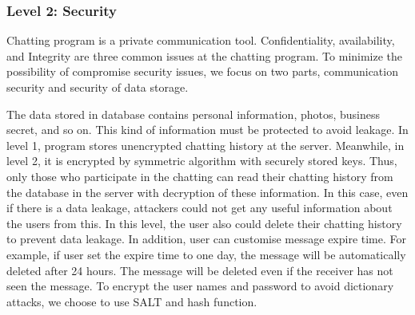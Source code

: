 \documentclass[a4paper,11pt]{article}
\begin{document}
\begin{itemize}
\begin{enumerate}
\end{enumerate}
\end{itemize}






\subsubsection{Level 2: Security}

Chatting program is a private communication tool. Confidentiality, availability, and Integrity are three common issues at the chatting program. To minimize the possibility of compromise security issues, we focus on two parts, communication security and security of data storage.     

The data stored in database contains personal information, photos, business secret, and so on. This kind of information must be protected to avoid leakage. In level 1, program stores unencrypted chatting history at the server. Meanwhile, in level 2, it is encrypted by symmetric algorithm with securely stored keys. Thus, only those who participate in the chatting can read their chatting history from the database in the server with decryption of these information. In this case, even if there is a data leakage, attackers could not get any useful information about the users from this. In this level, the user also could delete their chatting history to prevent data leakage. In addition, user can customise message expire time. For example, if user set the expire time to one day, the message will be automatically deleted after 24 hours. The message will be deleted even if the receiver has not seen the message. To encrypt the user names and password to avoid dictionary attacks, we choose to use SALT and hash function. 
\end{document}
